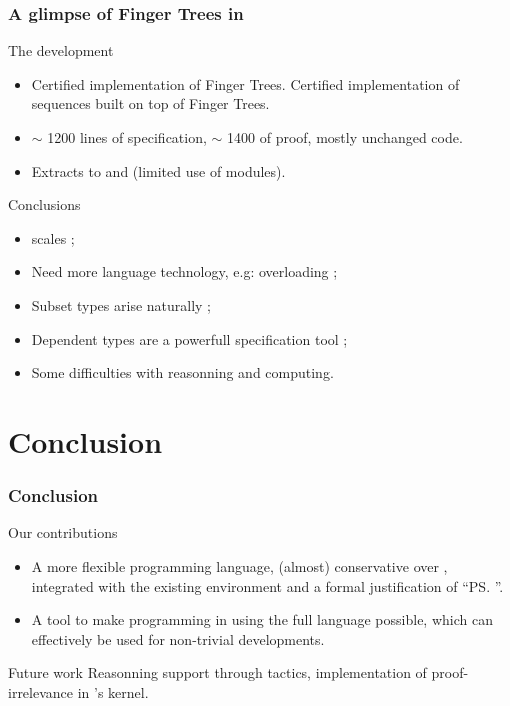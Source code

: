 \begin{frame}
  \frametitle{A glimpse of Finger Trees in \Coq}
  
  \begin{block}{The development}
    \begin{itemize}
    \item Certified implementation of Finger Trees. 
      Certified implementation of sequences built on top of Finger Trees.
    \item $\sim$ 1200 lines of specification, $\sim$ 1400 of proof, mostly unchanged
      code.
    \item Extracts to \Haskell and \ML (limited use of modules).
    \end{itemize}
  \end{block}
  \pause
  \begin{block}{Conclusions}
    \begin{itemize}
    \item \Program scales ;
    \item Need more language technology, e.g: overloading ;
    \item Subset types arise naturally ;
    \item Dependent types are a powerfull specification tool ;
    \item Some difficulties with reasonning and computing.
    \end{itemize}   
  \end{block}
  
\end{frame}

\section{Conclusion}
\begin{frame}
  \frametitle{Conclusion}
  
  \begin{block}{Our contributions}
    \begin{itemize}
    \item A more \alert{flexible} programming language, (almost) \alert{conservative} over
      \CIC, \alert{integrated} with the existing environment and a
      formal \alert{justification} of ``\ps{}''.
    \item A tool to make programming in \Coq using the \alert{full} language
      possible, which can \alert{effectively} be used for non-trivial
      developments.
    \end{itemize}
  \end{block}
  
  \begin{block}{Future work}
    Reasonning support through tactics, implementation of
    proof-irrelevance in \Coq's kernel.
  \end{block}
  
\end{frame}

